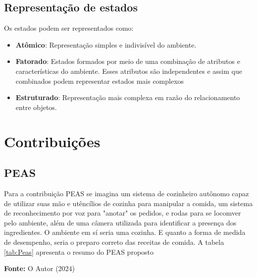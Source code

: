 \documentclass[a4paper,12pt]{article}
\begin{document}
\subsection{Representação de estados}
Os estados podem ser representados como:

\begin{itemize}
    \item \textbf{Atômico}: Representação simples e indivisível do ambiente.

    \item \textbf{Fatorado}: Estados formados por meio de uma combinação de atributos e características do ambiente. Esses atributos são independentes e assim que combinados podem representar estados mais complexos

    \item \textbf{Estruturado}: Representação mais complexa em razão do relacionamento entre objetos. 

\end{itemize}

\section{Contribuições}

\subsection{PEAS}

Para a contribuição PEAS se imagina um sistema de cozinheiro autônomo capaz de utilizar suas mão e utêncílios de cozinha para manipular a comida, um sistema de reconhecimento por voz para "anotar" os pedidos, e rodas para se locomver pelo ambiente, além de uma câmera utilizada para identificar a presença dos ingredientes. O ambiente em sí seria uma cozinha. E quanto a forma de medida de desempenho, seria o preparo correto das receitas de comida. A tabela \ref{tab:Peas} apresenta o resumo do PEAS proposto

\begin{table}[h]
    \caption{PEAS de um cozinheiro autônomo }
    \vspace{2mm}
    \centering
     \parbox{\linewidth}{\small
        \centering
        \textbf{Fonte:} O Autor (2024)
    }
    \label{tab:Peas}
\end{table}
\end{document}
